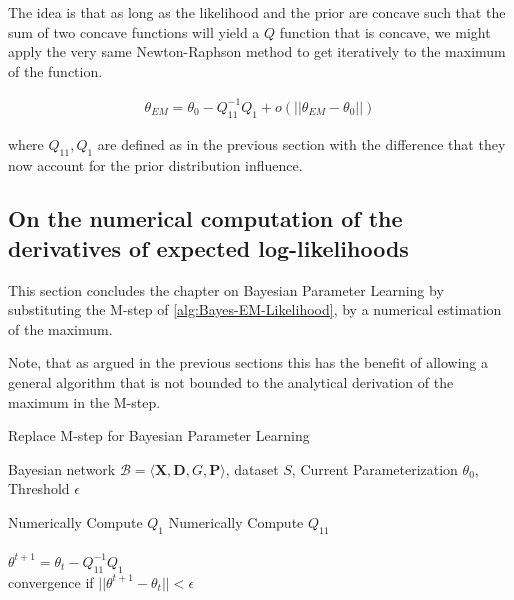 \documentclass[11pt]{article}
\begin{document}
\begin{article}
The idea is that as long as the likelihood and the prior are
concave such that the sum of two concave functions will yield a \(Q\)
function that is concave, we might apply the very same
Newton-Raphson method to get iteratively to the maximum of the
function.

\begin{align} 
 \theta_{EM}  = \theta_{0} - Q_{11}^{-1} Q_1 + o(||\theta_{EM} - \theta_{0}||) \label{eq:em-iterative2}
\end{align}

where \(Q_{11}, Q_1\) are defined as in the previous section with the
difference that they now account for the prior distribution
influence.

\subsection{On the numerical computation of the derivatives of expected log-likelihoods}
\label{sec:org464a44f}

This section concludes the chapter on Bayesian Parameter Learning
by substituting the M-step of \ref{alg:Bayes-EM-Likelihood}, by a
numerical estimation of the maximum.

Note, that as argued in the previous sections this has the benefit
of allowing a general algorithm that is not bounded to the
analytical derivation of the maximum in the M-step.

\begin{algorithm*}[h!]
\caption{Replace M-step for Bayesian Parameter Learning}
\label{alg:Numerical-M-Step}
\vspace{-10pt}
\begin{multicols}{2}
\begin{algorithmic}[1] 
\Require Bayesian network $\mathcal{B}=\langle \mathbf{X},\mathbf{D}, G, \mathbf{P} \rangle$, dataset $S$, Current Parameterization $\theta_0$, Threshold $\epsilon$

   \State Numerically Compute $Q_1$
   \State Numerically Compute $Q_{11}$\\

   \\
      \State $\theta^{t+1}= \theta_{t} - Q_{11}^{-1} Q_1$\\
      \State convergence if $||\theta^{t+1} - \theta_{t}|| < \epsilon$
   \EndForAll
\end{algorithmic}
\end{multicols}
\end{algorithm*}


\end{article}
\end{document}
